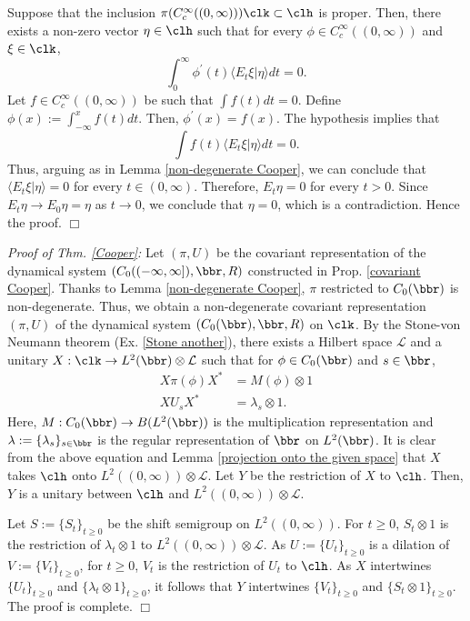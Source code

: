  Suppose that the inclusion $\pi(C_c^{\infty}((0,\infty)))\clk \subset \clh$ is proper. Then, there exists a non-zero vector $\eta \in \clh$ such that for every $\phi \in C_{c}^{\infty}((0,\infty))$ and $\xi \in \clk$,
 \[
 \int_{0}^{\infty} \phi^{'}(t)\langle E_t\xi|\eta \rangle dt=0.\]
 Let $f \in C_{c}^{\infty}((0,\infty))$ be such that $\int f(t)dt=0$. Define $\phi(x):=\int_{-\infty}^{x}f(t)dt$. Then, $\phi^{'}(x)=f(x)$. The hypothesis implies that 
 \[
 \int f(t)\langle E_t\xi|\eta \rangle dt=0.\]
 Thus, arguing as in Lemma \ref{non-degenerate Cooper}, we can conclude that $\langle E_t\xi|\eta\rangle =0$ for every $t \in (0,\infty)$. Therefore, $E_t\eta=0$ for every $t>0$. Since $E_t\eta \to E_0\eta=\eta$ as $t \to 0$, we conclude that $\eta=0$, which is a contradiction. Hence the proof. \hfill $\Box$
 
 
 \textit{Proof of Thm. \ref{Cooper}:} Let $(\pi,U)$ be the covariant representation of the dynamical system $(C_0((-\infty,\infty]),\bbr,R)$ constructed in Prop. \ref{covariant Cooper}. Thanks to Lemma \ref{non-degenerate Cooper}, $\pi$ restricted to $C_0(\bbr)$ is non-degenerate. Thus, we obtain a non-degenerate covariant representation $(\pi,U)$ of the dynamical system $(C_0(\bbr),\bbr,R)$ on $\clk$. By the Stone-von Neumann theorem (Ex. \ref{Stone another}), there exists a Hilbert space $\mathcal{L}$ and a unitary $X:\clk \to L^{2}(\bbr) \otimes \mathcal{L}$ such that for $\phi \in C_0(\bbr)$ and $s \in \bbr$, 
 \begin{align*}
 X\pi(\phi)X^{*}&=M(\phi)\otimes 1\\
 XU_sX^{*}&=\lambda_s \otimes 1.
 \end{align*}
 Here, $M:C_0(\bbr) \to B(L^{2}(\bbr))$ is the multiplication representation and $\lambda:=\{\lambda_s\}_{s \in \bbr}$ is the regular representation of $\bbr$ on $L^{2}(\bbr)$. It is clear from the above equation and Lemma \ref{projection onto the given space} that $X$ takes $\clh$ onto $L^{2}((0,\infty))\otimes \mathcal{L}$. Let $Y$ be the restriction of $X$ to $\clh$. Then, $Y$ is a unitary between $\clh$ and $L^{2}((0,\infty))\otimes \mathcal{L}$. 
 
 Let $S:=\{S_t\}_{t \geq 0}$ be the shift semigroup on $L^{2}((0,\infty))$. 
 For $t \geq 0$, $S_t \otimes 1$ is the restriction of $\lambda_t \otimes 1$ to $L^{2}((0,\infty))\otimes \mathcal{L}$. As $U:=\{U_t\}_{t \geq 0}$ is a dilation of $V:=\{V_t\}_{t \geq 0}$, for $t \geq 0$, $V_t$ is the restriction of $U_t$ to $\clh$. As $X$ intertwines $\{U_t\}_{t \geq 0}$ and $\{\lambda_t\otimes 1\}_{t \geq 0}$, it follows that $Y$ intertwines $\{V_t\}_{t \geq 0}$ and $\{S_t \otimes 1\}_{t \geq 0}$. The proof is complete. \hfill $\Box$
 
